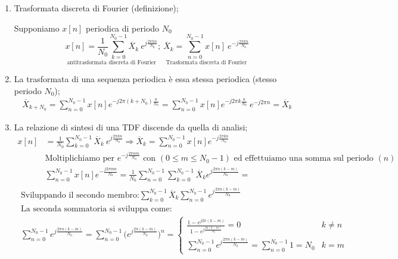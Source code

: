 \documentclass[
]{article}
\begin{document}
\begin{enumerate}
\def\labelenumi{\arabic{enumi}.}
\setcounter{enumi}{12}
\item
  Trasformata discreta di Fourier (definizione);

  Supponiamo \(x[n]\) periodica di periodo \(N_0\) \[
  \underset{\text{antitrasformata discreta di Fourier}}{x[n]=\frac{1}{N_0}\sum_{k=0}^{N_0 -1}\overline{X}_{k} \ e^{j\frac{2\pi kn}{N_0}}}; \
  \underset{\text{Trasformata discreta di Fourier}} {\overline{X}_k = \sum_{n=0}^{N_0 -1} x[n] \ e^{-j \frac{2\pi kn}{N_0}}}
  \]
\item
  La trasformata di una sequenza periodica è essa stessa periodica
  (stesso periodo \(N_0\)); \begin{gather*}
  \overline{X}_{k+N_0} = \sum_{n=0}^{N_0 -1} x[n] e^{-j2\pi(k+N_0)\frac{n}{N_0}} = \sum_{n=0}^{N_0 -1} x[n] e^{-j2\pi k\frac{n}{N_0}} \ e^{-j2\pi n} = \overline{X}_k
  \end{gather*}
\item
  La relazione di sintesi di una TDF discende da quella di analisi;
  \begin{align*}
  x[n] &=\frac{1}{N_0} \sum_{k=0}^{N_0 -1} \overline{X}_k \ e^{j\frac{2\pi kn}{N_0}} \Rightarrow \overline{X}_k = \sum_{n=0}^{N_0 -1} x[n] e^{-j\frac{2\pi kn}{N_0}} \\
  &\text{Moltiplichiamo per } e^{-j \frac{2\pi nm}{N_0}} \text{ con } (0\leq m \leq N_0 - 1) \text{ ed effettuiamo una somma sul periodo } (n)& \\
  &\sum_{n=0}^{N_0 -1} x[n] e^{-\frac{j2\pi mn}{N_0}} =\frac{1}{N_0} \sum_{n=0}^{N_0 -1} \sum_{k=0}^{N_0 -1}\overline{X}_k e^{j\frac{2\pi n(k-m)}{N_0}} = \end{align*}
  \begin{align*}
  \boxed{
      \begin{array}{cl}
          \text{Sviluppando il secondo membro:}
          \displaystyle\sum_{k=0}^{N_0 -1}\overline{X}_k \sum_{n=0}^{N_0 -1} e^{j\frac{2\pi n(k-m)}{N_0}} \\
          \text{La seconda sommatoria si sviluppa come}: \\
          \displaystyle 
          \sum_{n=0}^{N_0-1}e^{j\frac{2\pi n(k-m)}{N_0}}=\sum_{n=0}^{N_0-1}\Bigg(e^{j\frac{2\pi(k-m)}{N_0}}\Bigg)^{n}=
          \left\{
          \begin{array}{cl}
              \displaystyle \frac{1-e^{j2\pi(k-m)}}{1-e^{j\frac{2\pi(k-m)}{N_0}}}=0 & k\neq n\\
              \displaystyle \sum_{n=0}^{N_0-1}e^{j\frac{2\pi n(k-m)}{N_0}}=\sum_{n=0}^{N_0-1}1=N_0 & k=m

\end{array}
\end{array}}
\end{align*}
\end{enumerate}
\end{document}
